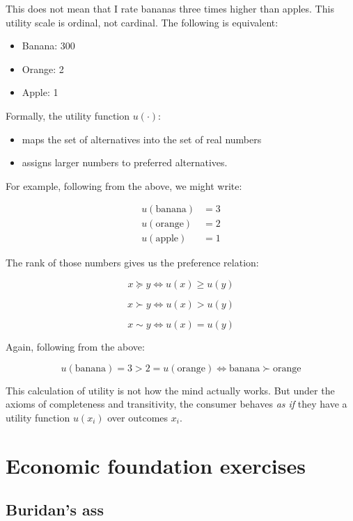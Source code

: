 \documentclass[
  letterpaper,
  DIV=11,
  numbers=noendperiod]{scrreprt}
\providecommand{\tightlist}{%
  \setlength{\itemsep}{0pt}\setlength{\parskip}{0pt}}\usepackage{longtable,booktabs,array}
\begin{document}
This does not mean that I rate bananas three times higher than apples.
This utility scale is ordinal, not cardinal. The following is
equivalent:

\begin{itemize}
\tightlist
\item
  Banana: 300
\item
  Orange: 2
\item
  Apple: 1
\end{itemize}

Formally, the utility function \(u(\cdot)\):

\begin{itemize}
\tightlist
\item
  maps the set of alternatives into the set of real numbers
\item
  assigns larger numbers to preferred alternatives.
\end{itemize}

For example, following from the above, we might write:

\begin{align*}
u(\text{banana})&=3 \\[6pt]
u(\text{orange})&=2 \\[6pt]
u(\text{apple})&=1
\end{align*}

The rank of those numbers gives us the preference relation:

\[
x\succcurlyeq y \Longleftrightarrow u(x)\geq u(y)
\]

\[
x\succ y \Longleftrightarrow u(x)>u(y)
\]

\[
x\sim y \Longleftrightarrow u(x)=u(y)
\]

Again, following from the above:

\[
u(\text{banana})=3>2=u(\text{orange})\Longleftrightarrow \text{banana}\succ \text{orange}
\]

This calculation of utility is not how the mind actually works. But
under the axioms of completeness and transitivity, the consumer behaves
\emph{as if} they have a utility function \(u(x_i)\) over outcomes
\(x_i\).

\hypertarget{economic-foundation-exercises}{%
\chapter{Economic foundation
exercises}\label{economic-foundation-exercises}}

\hypertarget{buridans-ass}{%
\section{Buridan's ass}\label{buridans-ass}}
\end{document}
